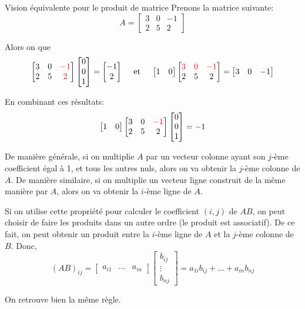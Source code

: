 \documentclass[a4paper]{article}
\begin{document}
\begin{parag}{Vision équivalente pour le produit de matrice}
    Prenons la matrice suivante:
    \[A = \begin{bmatrix} 3 & 0 & -1 \\ 2 & 5 & 2 \end{bmatrix} \]

    Alors on que
    \[\begin{bmatrix} 3 & 0 & {\color{red}-1} \\ 2 & 5 & {\color{red}2} \end{bmatrix} \begin{bmatrix} 0 \\ 0 \\ 1 \end{bmatrix} = \begin{bmatrix} -1 \\ 2 \end{bmatrix} \quad \text{ et } \quad \begin{bmatrix} 1 & 0 \end{bmatrix} \begin{bmatrix} {\color{red}3} & {\color{red}0} & {\color{red}-1} \\ 2 & 5 & 2 \end{bmatrix} = \begin{bmatrix} 3 & 0 & -1 \end{bmatrix} \]

    En combinant ces résultats:
    \[\begin{bmatrix} 1 & 0 \end{bmatrix} \begin{bmatrix} 3 & 0 & {\color{red}-1} \\ 2 & 5 & 2 \end{bmatrix} \begin{bmatrix} 0 \\ 0 \\ 1 \end{bmatrix} = -1\]

    De manière générale, si on multiplie $A$ par un vecteur colonne ayant son $j$-ème coefficient égal à 1, et tous les autres nuls, alors on va obtenir la $j$-ème colonne de $A$. De manière similaire, si on multiplie un vecteur ligne construit de la même manière par $A$, alors on va obtenir la $i$-ème ligne de $A$.

    Si on utilise cette propriété pour calculer le coefficient $\left(i, j\right)$ de $AB$, on peut choisir de faire les produits dans un autre ordre (le produit est associatif). De ce fait, on peut obtenir un produit entre la $i$-ème ligne de $A$ et la $j$-ème colonne de $B$. Donc,
    \[\left(AB\right)_{ij} = \begin{bmatrix} a_{i1} & \ldots & a_{in} \end{bmatrix} \begin{bmatrix} b_{ij} \\ \vdots \\ b_{nj} \end{bmatrix} = a_{1i} b_{ij} + \ldots + a_{in} b_{nj}\]

    On retrouve bien la même règle.

\end{parag}
\end{document}
